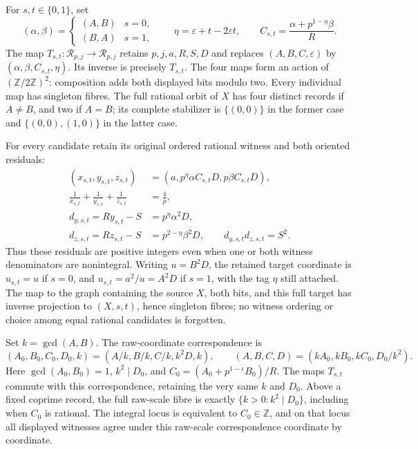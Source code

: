 \begin{theorem}
\label{thm:boundary-four-rational}
For \(s,t\in\{0,1\}\), set
\[
 (\alpha,\beta)=
 \begin{cases}(A,B)&s=0,\\(B,A)&s=1,\end{cases}
 \qquad \eta=\varepsilon+t-2\varepsilon t,
 \qquad C_{s,t}=\frac{\alpha+p^{1-\eta}\beta}{R}.
\]
The map \(T_{s,t}:\mathcal R_{p,j}\to\mathcal R_{p,j}\)
retains \(p,j,a,R,S,D\) and replaces
\((A,B,C,\varepsilon)\) by
\((\alpha,\beta,C_{s,t},\eta)\). Its inverse is precisely
\(T_{s,t}\). The four maps form an action of
\((\mathbb Z/2\mathbb Z)^2\): composition adds both displayed
bits modulo two. Every individual map has singleton fibres.
The full rational orbit of \(X\) has four distinct records if
\(A\ne B\), and two if \(A=B\); its complete stabilizer is
\(\{(0,0)\}\) in the former case and
\(\{(0,0),(1,0)\}\) in the latter case.

For every candidate retain its original ordered rational witness and
both oriented residuals:
\begin{align*}
 (x_{s,t},y_{s,t},z_{s,t})
   &=(a,p^\eta\alpha C_{s,t}D,p\beta C_{s,t}D),\\
 \frac1{x_{s,t}}+\frac1{y_{s,t}}+\frac1{z_{s,t}}&=\frac4p,\\
 d_{y,s,t}=Ry_{s,t}-S&=p^\eta\alpha^2D,\\
 d_{z,s,t}=Rz_{s,t}-S&=p^{2-\eta}\beta^2D,
 \qquad d_{y,s,t}d_{z,s,t}=S^2.
\end{align*}
Thus these residuals are positive integers even when one or both
witness denominators are nonintegral. Writing
\(u=B^2D\), the retained target coordinate is
\(u_{s,t}=u\) if \(s=0\), and
\(u_{s,t}=a^2/u=A^2D\) if \(s=1\), with the tag
\(\eta\) still attached. The map to the graph containing the
source \(X\), both bits, and this full target has inverse projection
to \((X,s,t)\), hence singleton fibres; no witness ordering or
choice among equal rational candidates is forgotten.

Set \(k=\gcd(A,B)\). The raw-coordinate correspondence is
\[
 (A_0,B_0,C_0,D_0,k)
   =(A/k,B/k,C/k,k^2D,k),\qquad
 (A,B,C,D)=(kA_0,kB_0,kC_0,D_0/k^2).
\]
Here \(\gcd(A_0,B_0)=1\), \(k^2\mid D_0\), and
\(C_0=(A_0+p^{1-\varepsilon}B_0)/R\).
The maps \(T_{s,t}\) commute with this correspondence, retaining
the very same \(k\) and \(D_0\). Above a fixed coprime record,
the full raw-scale fibre is exactly
\(\{k>0:k^2\mid D_0\}\), including when \(C_0\) is rational.
The integral locus is equivalent to \(C_0\in\mathbb Z\), and
on that locus all displayed witnesses agree under this raw-scale
correspondence coordinate by coordinate.
\end{theorem}

